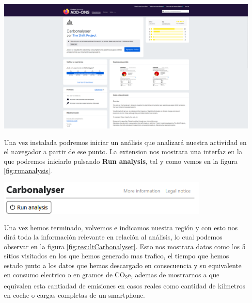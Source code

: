 \documentclass[12pt,a4paper]{report}
\begin{document}
\begin{center}
  \includegraphics[width=1\textwidth]{imagenes/Carbonalyser_1.png}
  \label{fig:tienda}
\end{center}

Una vez instalada podremos iniciar un análisis que analizará nuestra actividad
en el navegador a partir de ese punto. La extension nos mostrara una interfaz en la que
podremos iniciarlo pulsando \textbf{Run analysis}, tal y como vemos en la figura \ref{fig:runanalysis}. 

\begin{center}
  \includegraphics[width=0.8\textwidth]{imagenes/Carbonalyser_2.png}
  \label{fig:runanalysis}
\end{center}

Una vez hemos terminado, volvemos e indicamos nuestra región y con esto nos
dirá toda la información relevante en relación al análisis, lo cual podemos observar en la figura \ref{fig:resultCarbonalyser}. Esto nos mostrara datos como
los 5 sitios visitados en los que hemos generado mas trafico, el tiempo que hemos estado junto a los
datos que hemos descargado en consecuencia y su equivalente en consumo electrico o en gramos de CO\textsubscript{2}e, ademas
de mostrarnos a que equivalen esta cantiadad de emisiones en casos reales como cantidad de kilmetros en coche o cargas completas de un smartphone. 
\end{document}
